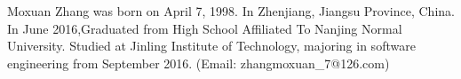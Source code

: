 \documentclass[conference]{IEEEtran}
\begin{document}
\vspace{-30ex}
\begin{IEEEbiography}{Moxuan Zhang}
was born on April 7, 1998. In Zhenjiang, Jiangsu Province, China. In June 2016,Graduated from High School Affiliated To Nanjing Normal University. Studied at Jinling Institute of Technology, majoring in software engineering from September 2016. (Email: zhangmoxuan\_7@126.com)

\end{IEEEbiography}
\end{document}
